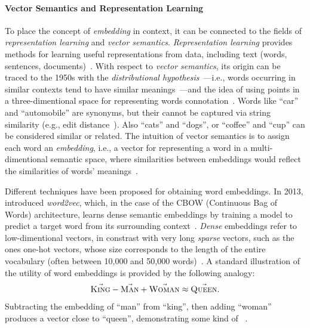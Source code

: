\paragraph{Vector Semantics and Representation Learning}
To place the concept of \emph{embedding} in context, it can be connected to the fields of \emph{representation learning} and \emph{vector semantics}.
\emph{Representation learning} provides methods for learning useful representations from data, including text (words, sentences, documents)~\cite{bengio_representation_learning_2013}.
With respect to \emph{vector semantics}, its origin can be traced to the 1950s with the \emph{distributional hypothesis}~\cite{Harris01081954}---i.e., words occurring in similar contexts tend to have similar meanings~\cite{jm3}---and the idea of using points in a three-dimentional space for representing words connotation~\cite{osgood1957}. Words like ``car'' and ``automobile'' are synonyms, but their  cannot be captured via string similarity (e.g., edit distance~\cite{jm3}). Also ``cats'' and ``dogs'', or ``coffee'' and ``cup'' can be considered similar or related.
The intuition of vector semantics is to assign each word an \emph{embedding}, i.e., a vector for representing a word in a multi-dimentional semantic space, where similarities between embeddings would reflect the similarities of words' meanings~\cite{jm3}.

Different techniques have been proposed for obtaining word embeddings. In 2013, \textcite{mikolov2013} introduced \emph{word2vec}, which, in the case of the CBOW (Continuous Bag of Words) architecture, learns dense semantic embeddings by training a model to predict a target word from its surrounding context~\cite{mikolov2013}. \emph{Dense} embeddings refer to low-dimentional vectors, in constrast with very long \emph{sparse} vectors, such as the ones one-hot vectors, whose size corresponds to the length of the entire vocabulary (often between 10,000 and 50,000 words)~\cite{jm3}.
%
A standard illustration of the utility of word embeddings is provided by the following analogy:
\begin{equation}
\vec{\textsc{King}} - \vec{\textsc{Man}} + \vec{\textsc{Woman}} \approx \vec{\textsc{Queen}}.
\end{equation}
Subtracting the embedding of ``man'' from ``king'', then adding ``woman'' produces a vector close to ``queen'', demonstrating some kind of  ~\cite{mikolov-etal-2013-linguistic}.

